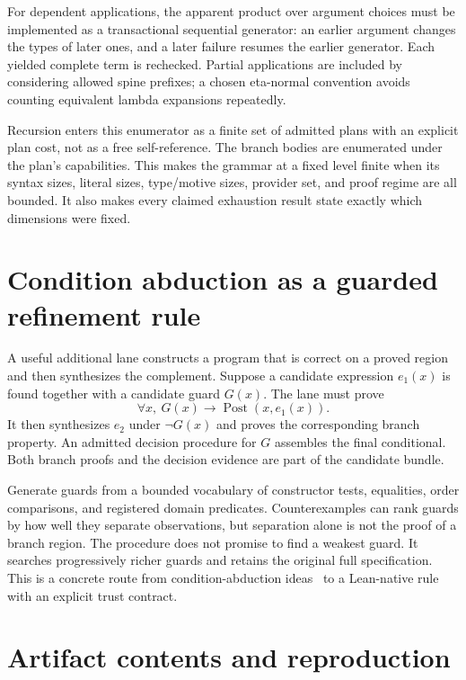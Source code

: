 \documentclass[11pt,letterpaper]{article}
\theoremstyle{definition}
\theoremstyle{remark}
\begin{document}
For dependent applications, the apparent product over argument choices must be implemented as a transactional sequential generator: an earlier argument changes the types of later ones, and a later failure resumes the earlier generator. Each yielded complete term is rechecked. Partial applications are included by considering allowed spine prefixes; a chosen eta-normal convention avoids counting equivalent lambda expansions repeatedly.

Recursion enters this enumerator as a finite set of admitted plans with an explicit plan cost, not as a free self-reference. The branch bodies are enumerated under the plan's capabilities. This makes the grammar at a fixed level finite when its syntax sizes, literal sizes, type/motive sizes, provider set, and proof regime are all bounded. It also makes every claimed exhaustion result state exactly which dimensions were fixed.

\section{Condition abduction as a guarded refinement rule}
\label{app:guards}

A useful additional lane constructs a program that is correct on a proved region and then synthesizes the complement. Suppose a candidate expression $e_1(x)$ is found together with a candidate guard $G(x)$. The lane must prove
\[
 \forall x,\ G(x)\to\operatorname{Post}(x,e_1(x)).
\]
It then synthesizes $e_2$ under $\neg G(x)$ and proves the corresponding branch property. An admitted decision procedure for $G$ assembles the final conditional. Both branch proofs and the decision evidence are part of the candidate bundle.

Generate guards from a bounded vocabulary of constructor tests, equalities, order comparisons, and registered domain predicates. Counterexamples can rank guards by how well they separate observations, but separation alone is not the proof of a branch region. The procedure does not promise to find a weakest guard. It searches progressively richer guards and retains the original full specification. This is a concrete route from condition-abduction ideas~\cite{refinementlecture} to a Lean-native rule with an explicit trust contract.

\section{Artifact contents and reproduction}
\label{app:artifacts}
\end{document}
